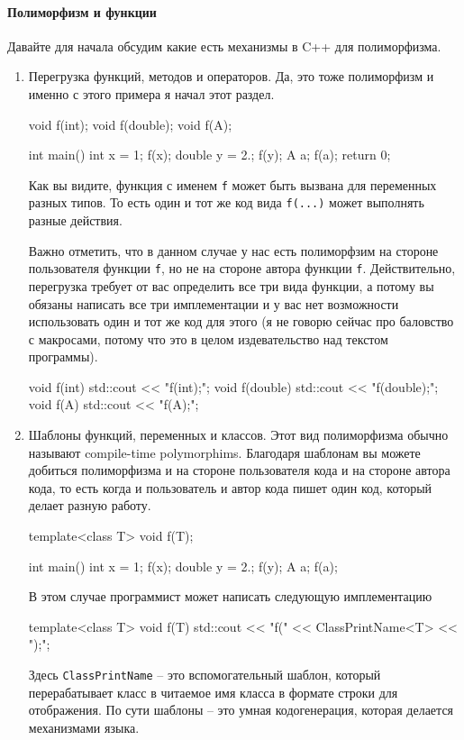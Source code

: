 \paragraph{Полиморфизм и функции}

Давайте для начала обсудим какие есть механизмы в C++ для полиморфизма.
\begin{enumerate}
\item Перегрузка функций, методов и операторов.
Да, это тоже полиморфизм и именно с этого примера я начал этот раздел.
\begin{cppcode}
void f(int);
void f(double);
void f(A);

int main() {
  int x = 1;
  f(x);
  double y = 2.;
  f(y);
  A a;
  f(a);
 return 0;
}
\end{cppcode}
Как вы видите, функция с именем \texttt{f} может быть вызвана для переменных разных типов.
То есть один и тот же код вида \texttt{f(...)} может выполнять разные действия.

Важно отметить, что в данном случае у нас есть полиморфзим на стороне пользователя функции \texttt{f}, но не на стороне автора функции \texttt{f}.
Действительно, перегрузка требует от вас определить все три вида функции, а потому вы обязаны написать все три имплементации и у вас нет возможности использовать один и тот же код для этого (я не говорю сейчас про баловство с макросами, потому что это в целом издевательство над текстом программы).
\begin{cppcode}
void f(int) {
  std::cout << "f(int);\n";
}
void f(double) {
  std::cout << "f(double);\n";
}
void f(A) {
  std::cout << "f(A);\n";
}
\end{cppcode}

\item Шаблоны функций, переменных и классов.
Этот вид полиморфизма обычно называют compile-time polymorphims.
Благодаря шаблонам вы можете добиться полиморфизма и на стороне пользователя кода и на стороне автора кода, то есть когда и пользователь и автор кода пишет один код, который делает разную работу.
\begin{cppcode}
template<class T>
void f(T);

int main() {
  int x = 1;
  f(x);
  double y = 2.;
  f(y);
  A a;
  f(a);
}
\end{cppcode}
В этом случае программист может написать следующую имплементацию
\begin{cppcode}
template<class T>
void f(T) {
  std::cout << "f(" << ClassPrintName<T> << ");\n";
}
\end{cppcode}
Здесь \texttt{ClassPrintName} -- это вспомогательный шаблон, который перерабатывает класс в читаемое имя класса в формате строки для отображения.
По сути шаблоны -- это умная кодогенерация, которая делается механизмами языка.


\end{enumerate}
